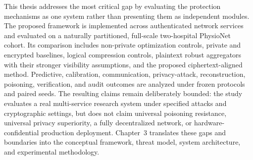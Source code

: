 This thesis addresses the most critical gap by evaluating the protection mechanisms as one system rather than presenting them as independent modules. The proposed framework is implemented across authenticated network services and evaluated on a naturally partitioned, full-scale two-hospital PhysioNet cohort. Its comparison includes non-private optimization controls, private and encrypted baselines, logical compression controls, plaintext robust aggregators with their stronger visibility assumptions, and the proposed ciphertext-aligned method. Predictive, calibration, communication, privacy-attack, reconstruction, poisoning, verification, and audit outcomes are analyzed under frozen protocols and paired seeds. The resulting claims remain deliberately bounded: the study evaluates a real multi-service research system under specified attacks and cryptographic settings, but does not claim universal poisoning resistance, universal privacy superiority, a fully decentralized network, or hardware-confidential production deployment. Chapter~3 translates these gaps and boundaries into the conceptual framework, threat model, system architecture, and experimental methodology.
